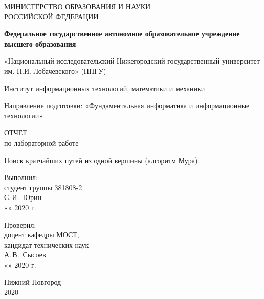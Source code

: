 \documentclass{report}
\begin{document}
\begin{titlepage}
  \begin{center}
    \large
    МИНИСТЕРСТВО ОБРАЗОВАНИЯ И НАУКИ\\ РОССИЙСКОЙ ФЕДЕРАЦИИ
     
    \textbf{Федеральное государственное автономное образовательное учреждение высшего образования}
    \vspace{0.5cm}
 
    «Национальный исследовательский Нижегородский государственный университет им. Н.И. Лобачевского» (ННГУ)
    \vspace{0.25cm}
     
    Институт информационных технологий, математики и механики
     
    Направление подготовки: «Фундаментальная информатика и информационные технологии»
    \vspace{0.75cm}
     
     
    ОТЧЕТ\\
    по лабораторной работе
    \vfill
      
    {\LARGE Поиск кратчайших путей из одной вершины (алгоритм Мура).}
  \bigskip
     
\end{center}
\vfill
 
\newlength{\ML}
\hfill\begin{minipage}{0.4\textwidth}
  Выполнил:\\
  студент группы 381808-2\\
  \underline{\hspace{\ML}} С.\,И.~Юрин\\
  «\underline{\hspace{0.7cm}}» \underline{\hspace{2cm}} 2020 г.
\end{minipage}%
\bigskip
 
\hfill\begin{minipage}{0.4\textwidth}
  Проверил:\\
  доцент кафедры МОСТ, \\
  кандидат технических наук \\
  \underline{\hspace{\ML}} А.\,В.~Сысоев\\
  «\underline{\hspace{0.7cm}}» \underline{\hspace{2cm}} 2020 г.
\end{minipage}%
\vfill
 
\begin{center}
  Нижний Новгород\\
  2020
\end{center}
\end{titlepage}
\end{document}
